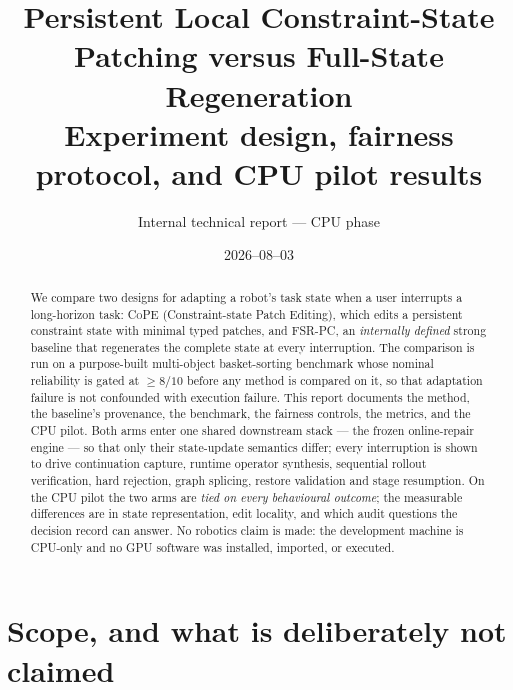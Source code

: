 \documentclass[11pt]{article}
\title{\bfseries Persistent Local Constraint-State Patching versus
Full-State Regeneration\\[4pt]
\large Experiment design, fairness protocol, and CPU pilot results}
\author{Internal technical report --- CPU phase}
\date{2026--08--03}
\newcommand{\cope}{\textsc{CoPE}}
\newcommand{\fsrpc}{\textsc{FSR-PC}}
\begin{document}
\maketitle

\begin{abstract}
We compare two designs for adapting a robot's task state when a user interrupts
a long-horizon task: \cope{} (Constraint-state Patch Editing), which edits a
persistent constraint state with minimal typed patches, and \fsrpc{}, an
\emph{internally defined} strong baseline that regenerates the complete state at
every interruption. The comparison is run on a purpose-built multi-object
basket-sorting benchmark whose nominal reliability is gated at
$\geq 8/10$ before any method is compared on it, so that adaptation failure is
not confounded with execution failure. This report documents the method, the
baseline's provenance, the benchmark, the fairness controls, the metrics, and
the CPU pilot. Both arms enter one shared downstream stack --- the frozen
online-repair engine --- so that only their state-update semantics differ; every
interruption is shown to drive continuation capture, runtime operator synthesis,
sequential rollout verification, hard rejection, graph splicing, restore
validation and stage resumption. On the CPU pilot the two arms are \emph{tied on
every behavioural outcome}; the measurable differences are in state
representation, edit locality, and which audit questions the decision record can
answer. No robotics claim is made: the development machine is CPU-only and no
GPU software was installed, imported, or executed.
\end{abstract}

\tableofcontents

\section{Scope, and what is deliberately not claimed}
\end{document}
